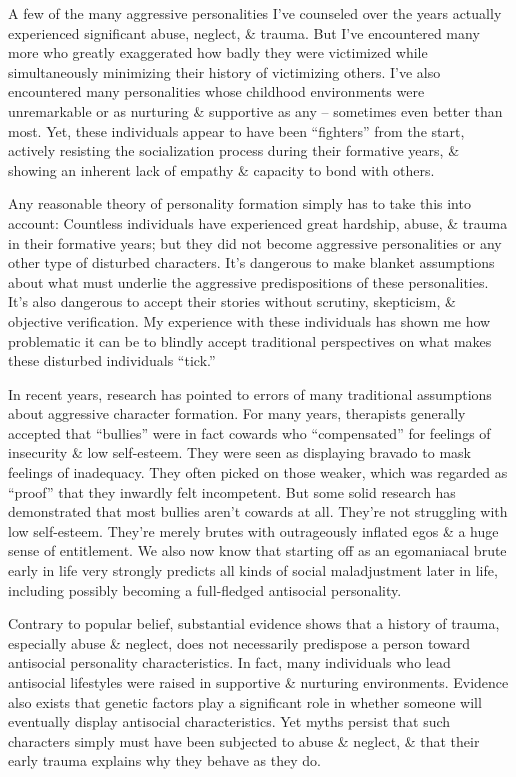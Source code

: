 \documentclass{article}
\numberwithin{equation}{section}
\begin{document}
A few of the many aggressive personalities I've counseled over the years actually experienced significant abuse, neglect, \& trauma. But I've encountered many more who greatly exaggerated how badly they were victimized while simultaneously minimizing their history of victimizing others. I've also encountered many personalities whose childhood environments were unremarkable or as nurturing \& supportive as any -- sometimes even better than most. Yet, these individuals appear to have been ``fighters'' from the start, actively resisting the socialization process during their formative years, \& showing an inherent lack of empathy \& capacity to bond with others.

Any reasonable theory of personality formation simply has to take this into account: Countless individuals have experienced great hardship, abuse, \& trauma in their formative years; but they did not become aggressive personalities or any other type of disturbed characters. It's dangerous to make blanket assumptions about what must underlie the aggressive predispositions of these personalities. It's also dangerous to accept their stories without scrutiny, skepticism, \& objective verification. My experience with these individuals has shown me how problematic it can be to blindly accept traditional perspectives on what makes these disturbed individuals ``tick.''

In recent years, research has pointed to errors of many traditional assumptions about aggressive character formation. For many years, therapists generally accepted that ``bullies'' were in fact cowards who ``compensated'' for feelings of insecurity \& low self-esteem. They were seen as displaying bravado to mask feelings of inadequacy. They often picked on those weaker, which was regarded as ``proof'' that they inwardly felt incompetent. But some solid research has demonstrated that most bullies aren't cowards at all. They're not struggling with low self-esteem. They're merely brutes with outrageously inflated egos \& a huge sense of entitlement. We also now know that starting off as an egomaniacal brute early in life very strongly predicts all kinds of social maladjustment later in life, including possibly becoming a full-fledged antisocial personality.

Contrary to popular belief, substantial evidence shows that a history of trauma, especially abuse \& neglect, does not necessarily predispose a person toward antisocial personality characteristics. In fact, many individuals who lead antisocial lifestyles were raised in supportive \& nurturing environments. Evidence also exists that genetic factors play a significant role in whether someone will eventually display antisocial characteristics. Yet myths persist that such characters simply must have been subjected to abuse \& neglect, \& that their early trauma explains why they behave as they do.
\end{document}
